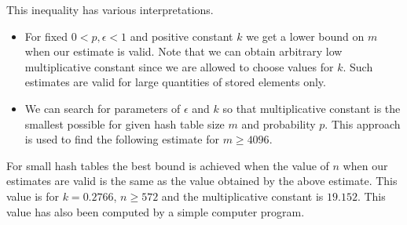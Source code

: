 This inequality has various interpretations.
\begin{itemize}
\item For fixed $0 < p, \epsilon < 1$ and positive constant $k$ we get a lower bound on $m$ when our estimate is valid. Note that we can obtain arbitrary low multiplicative constant since we are allowed to choose values for $k$. Such estimates are valid for large quantities of stored elements only.
\item We can search for parameters of $\epsilon$ and $k$ so that multiplicative constant is the smallest possible for given hash table size $m$ and probability $p$. This approach is used to find the following estimate for $m \geq 4096$.
\end{itemize}

For small hash tables the best bound is achieved when the value of $n$ when our estimates are valid is the same as the value obtained by the above estimate. This value is for $k = 0.2766$, $n \geq 572$ and the multiplicative constant is $19.152$. This value has also been computed by a simple computer program.

